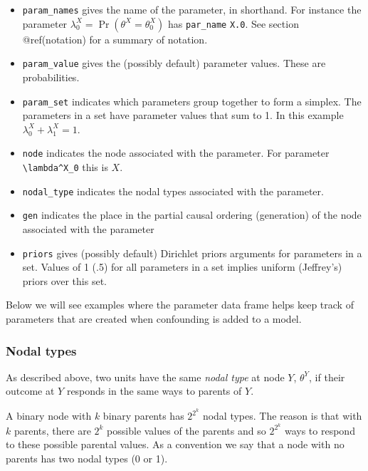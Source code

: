 \documentclass[
  11pt,
  article]{jss}
\providecommand{\tightlist}{%
  \setlength{\itemsep}{0pt}\setlength{\parskip}{0pt}}\usepackage{longtable,booktabs,array}
\begin{document}
\begin{itemize}
\tightlist
\item
  \texttt{param\_names} gives the name of the parameter, in shorthand.
  For instance the parameter
  \(\lambda^X_0 = \Pr(\theta^X = \theta^X_0)\) has \texttt{par\_name}
  \texttt{X.0}. See section @ref(notation) for a summary of notation.
\item
  \texttt{param\_value} gives the (possibly default) parameter values.
  These are probabilities.\\
\item
  \texttt{param\_set} indicates which parameters group together to form
  a simplex. The parameters in a set have parameter values that sum to
  1. In this example \(\lambda^X_0 + \lambda^X_1 = 1\).
\item
  \texttt{node} indicates the node associated with the parameter. For
  parameter \texttt{\textbackslash{}lambda\^{}X\_0} this is \(X\).
\item
  \texttt{nodal\_type} indicates the nodal types associated with the
  parameter.
\item
  \texttt{gen} indicates the place in the partial causal ordering
  (generation) of the node associated with the parameter
\item
  \texttt{priors} gives (possibly default) Dirichlet priors arguments
  for parameters in a set. Values of 1 (.5) for all parameters in a set
  implies uniform (Jeffrey's) priors over this set.
\end{itemize}

Below we will see examples where the parameter data frame helps keep
track of parameters that are created when confounding is added to a
model.

\hypertarget{sec-nodal-types}{%
\subsubsection{Nodal types}\label{sec-nodal-types}}

As described above, two units have the same \emph{nodal type} at node
\(Y\), \(\theta^Y\), if their outcome at \(Y\) responds in the same ways
to parents of \(Y\).

A binary node with \(k\) binary parents has \(2^{2^k}\) nodal types. The
reason is that with \(k\) parents, there are \(2^k\) possible values of
the parents and so \(2^{2^k}\) ways to respond to these possible
parental values. As a convention we say that a node with no parents has
two nodal types (0 or 1).
\end{document}
